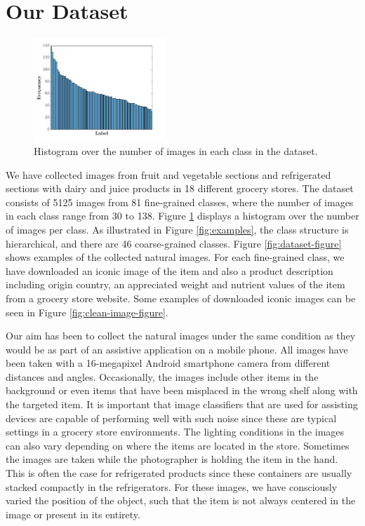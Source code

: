 \section{Our Dataset}\label{paperA:sec:our-dataset}

\begin{figure}
	\centering
	\includegraphics[width=0.44\textwidth, height=0.23\textwidth]{PaperA/figures/hist1_latex_bf14.png}
	\vspace{-6mm}
	\captionsetup{width=.88\linewidth}
	\caption{Histogram over the number of images in each class in the dataset.}
	\vspace{-2mm}
	\label{fig:hist}
\end{figure}
We have collected images from fruit and vegetable sections and refrigerated sections with dairy and juice products in 18 different grocery stores. The dataset consists of 5125 images from 81 fine-grained classes, where the number of images in each class range from 30 to 138. Figure \ref{fig:hist} displays a histogram over the number of images per class. As illustrated in Figure \ref{fig:examples}, the class structure is hierarchical, and there are 46 coarse-grained classes. Figure \ref{fig:dataset-figure} shows examples of the collected natural images. For each fine-grained class, we have downloaded an iconic image of the item and also a product description including origin country, an appreciated weight and nutrient values of the item from a grocery store website. Some examples of downloaded iconic images can be seen in Figure \ref{fig:clean-image-figure}. 

Our aim has been to collect the natural images under the same condition as they would be as part of an assistive application on a mobile phone. All images have been taken with a 16-megapixel Android smartphone camera from different distances and angles. Occasionally, the images include other items in the background or even items that have been misplaced in the wrong shelf along with the targeted item. It is important that image classifiers that are used for assisting devices are capable of performing well with such noise since these are typical settings in a grocery store environments. The lighting conditions in the images can also vary depending on where the items are located in the store. 
Sometimes the images are taken while the photographer is holding the item in the hand. This is often the case for refrigerated products since these containers are usually stacked compactly in the refrigerators. For these images, we have consciously varied the position of the object, such that the item is not always centered in the image or present in its entirety. 

